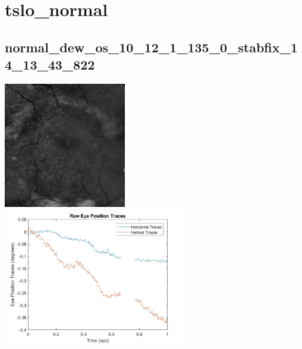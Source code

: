 \documentclass[11pt]{article}
\begin{document}
\section{tslo\_normal}

\subsection{normal\_dew\_os\_10\_12\_1\_135\_0\_stabfix\_14\_13\_43\_822}
\includegraphics[width=0.40\textwidth, valign=m]{referenceframes/tslo_normal/normal_dew_os_10_12_1_135_0_stabfix_14_13_43_822_dwt_nostim_gamscaled_bandfilt_refframe.jpg}
\includegraphics[width=0.60\textwidth, valign=m]{eyepositiontraces/tslo_normal/normal_dew_os_10_12_1_135_0_stabfix_14_13_43_822.jpg}\\
\end{document}
